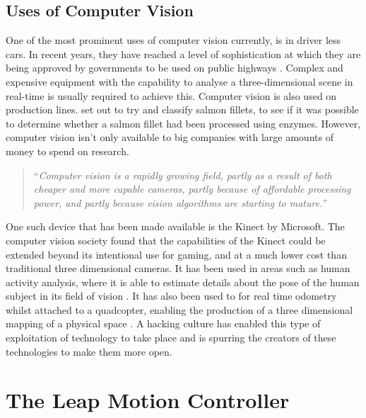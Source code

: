 \documentclass[11pt,oneside]{report}
\begin{document}
			\subsection{Uses of Computer Vision}
				One of the most prominent uses of computer vision currently, is in driver less cars.
				In recent years, they have reached a level of sophistication at which they are being approved by governments to be used on public highways \cite{web:driverlessCars}.
				Complex and expensive equipment with the capability to analyse a three-dimensional scene in real-time is usually required to achieve this.
				Computer vision is also used on production lines.
				 set out to try and classify salmon fillets, to see if it was possible to determine whether a salmon fillet had been processed using enzymes. %
				However, computer vision isn't only available to big companies with large amounts of money to spend on research.
				\begin{quote}
				``\textit{Computer vision is a rapidly growing field, partly as a result of both cheaper and more capable cameras, partly because of affordable processing power, and partly because vision algorithms are starting to mature.}''\cite[p. ix]{definition:cv}
				\end{quote}
				One such device that has been made available is the Kinect by Microsoft.
				The computer vision society found that the capabilities of the Kinect could be extended beyond its intentional use for gaming, and at a much lower cost than traditional three dimensional cameras.
				It has been used in areas such as human activity analysis, where it is able to estimate details about the pose of the human subject in its field of vision \cite{kinect:1}.
				It has also been used to for real time odometry whilst attached to a quadcopter, enabling the production of a three dimensional mapping of a physical space \cite{kinect:2}.
				A hacking culture has enabled this type of exploitation of technology to take place and is spurring the creators of these technologies to make them more open.
				
		\section{The Leap Motion Controller}
\end{document}
